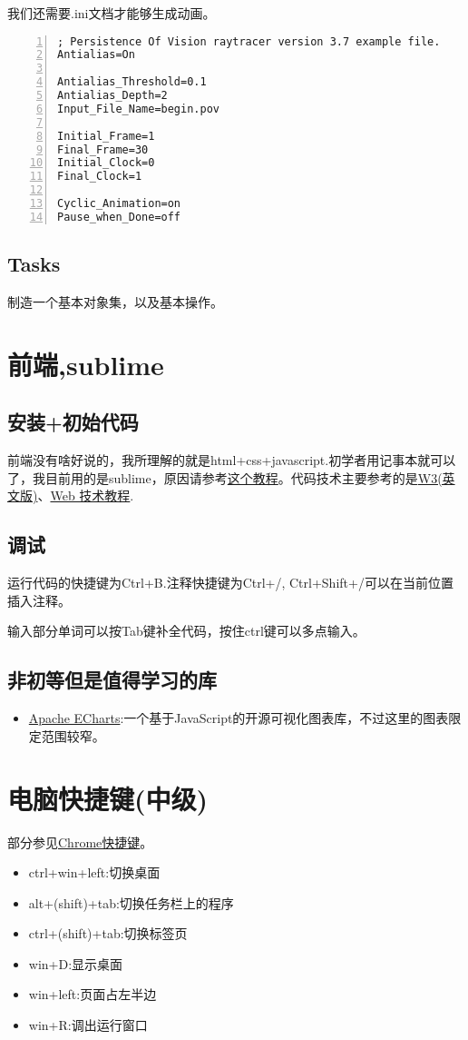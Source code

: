 \documentclass[11pt]{amsart}
\begin{document}
我们还需要.ini文档才能够生成动画。
\begin{lstlisting}[numbers=left,numberstyle=\tiny,numbersep=10pt]
; Persistence Of Vision raytracer version 3.7 example file.
Antialias=On

Antialias_Threshold=0.1
Antialias_Depth=2
Input_File_Name=begin.pov

Initial_Frame=1
Final_Frame=30
Initial_Clock=0
Final_Clock=1

Cyclic_Animation=on
Pause_when_Done=off
\end{lstlisting}
\subsection{Tasks}
制造一个基本对象集，以及基本操作。
\section{前端,sublime}
\subsection{安装+初始代码}
前端没有啥好说的，我所理解的就是html+css+javascript.初学者用记事本就可以了，我目前用的是sublime，原因请参考\href{https://www.bilibili.com/video/BV1vx411z7rb}{这个教程}。代码技术主要参考的是\href{https://www.quanzhanketang.com/}{W3(英文版)}、\href{http://www.w3school.com.cn/}{Web 技术教程}.
\subsection{调试}
运行代码的快捷键为Ctrl+B.注释快捷键为Ctrl+/, Ctrl+Shift+/可以在当前位置插入注释。

输入部分单词可以按Tab键补全代码，按住ctrl键可以多点输入。
\subsection{非初等但是值得学习的库}
\begin{itemize}
\item \href{https://echarts.apache.org/zh/index.html}{Apache ECharts}:一个基于JavaScript的开源可视化图表库，不过这里的图表限定范围较窄。
\end{itemize}
\section{电脑快捷键(中级)}
部分参见\href{https://zhuanlan.zhihu.com/p/42281412}{Chrome快捷键}。
\begin{itemize}
	\item  ctrl+win+left:切换桌面
	\item  alt+(shift)+tab:切换任务栏上的程序
	\item  ctrl+(shift)+tab:切换标签页
	\item  win+D:显示桌面
	\item  win+left:页面占左半边
	\item  win+R:调出运行窗口
\end{itemize} 
\end{document}
